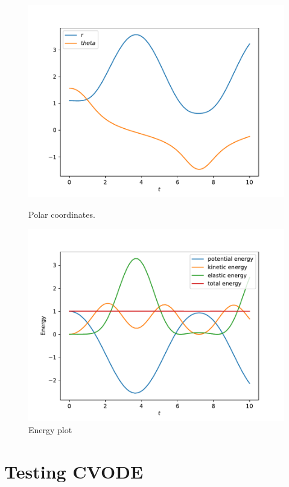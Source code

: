 \documentclass{scrartcl}
\begin{document}
\begin{figure}[h]
\centering
\begin{minipage}[b]{0.45\textwidth}
\centering
\includegraphics[width=\textwidth]{../Plots/Task4/Figure_0}
\caption{Polar coordinates.}
\label{pl:PolarPlot1}
\end{minipage}
\hfill
\begin{minipage}[b]{0.45\textwidth}
\centering
\includegraphics[width=\textwidth]{../Plots/Task4/Figure_3}
\caption{Energy plot}
\label{pl:EnergyPlot1}
\end{minipage}
\end{figure}

\section*{Testing CVODE}
\end{document}
